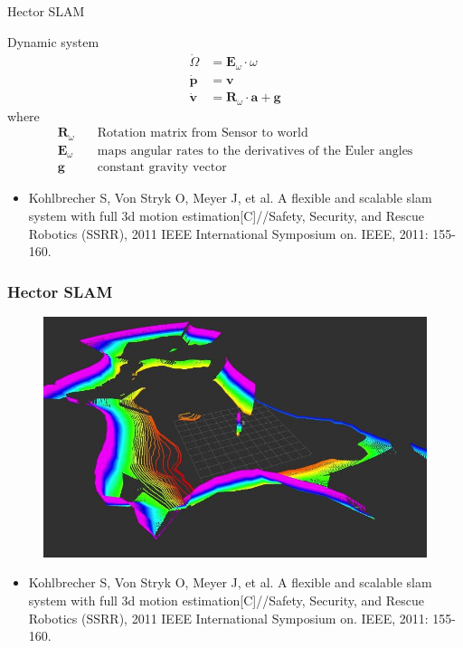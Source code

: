 \documentclass[14pt,hyperref={CJKbookmarks=true}]{beamer}
\theoremstyle{plain}
\theoremstyle{definition}
\theoremstyle{remark}
\begin{document}
\begin{frame}{Hector SLAM}
\begin{block}{Dynamic system}\small
\begin{equation*}
\begin{split}
\dot{\Omega}&=\mathbf{E}_\omega\cdot\omega\\
\dot{\mathbf{p}}&=\mathbf{v}\\
\dot{\mathbf{v}}&=\mathbf{R}_\omega\cdot\mathbf{a}+\mathbf{g}
\end{split}
\end{equation*} 
where\scriptsize
\begin{equation*}
\begin{split}
\mathbf{R}_\omega \quad & \text{Rotation matrix from Sensor to world}\\
\mathbf{E}_\omega \quad & \text{maps angular rates to the derivatives of the Euler angles}\\
\mathbf{g} \quad & \text{constant gravity vector}
\end{split}
\end{equation*} 
\begin{itemize}\tiny 
\item Kohlbrecher S, Von Stryk O, Meyer J, et al. A flexible and scalable slam system with full 3d motion estimation[C]//Safety, Security, and Rescue Robotics (SSRR), 2011 IEEE International Symposium on. IEEE, 2011: 155-160.
\end{itemize}
\end{block}

\end{frame}

\begin{frame}
\frametitle{Hector SLAM}
\begin{figure}
\centering
\includegraphics[width=0.6\linewidth]{hector-slam.jpg}
\end{figure}
\begin{itemize}\tiny 
\item Kohlbrecher S, Von Stryk O, Meyer J, et al. A flexible and scalable slam system with full 3d motion estimation[C]//Safety, Security, and Rescue Robotics (SSRR), 2011 IEEE International Symposium on. IEEE, 2011: 155-160.
\end{itemize}
\end{frame}
\end{document}
